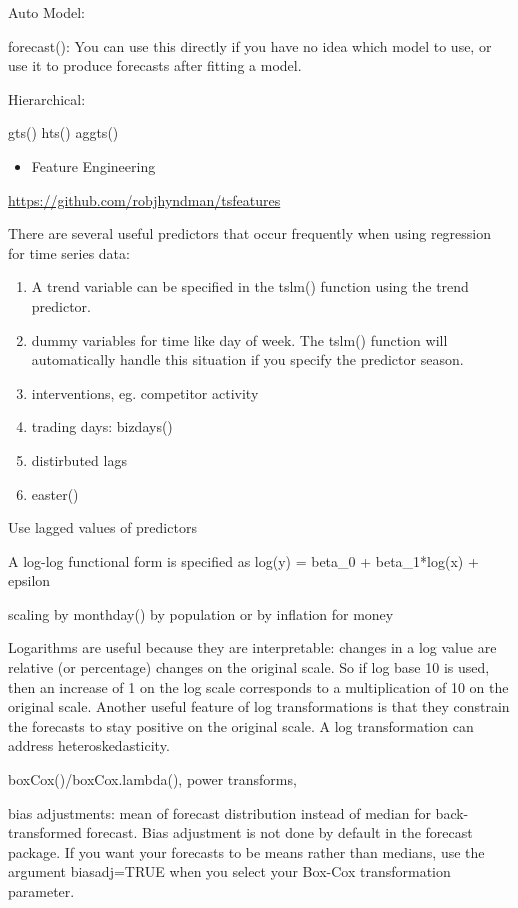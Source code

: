 \documentclass[]{book}
\providecommand{\tightlist}{%
  \setlength{\itemsep}{0pt}\setlength{\parskip}{0pt}}
\begin{document}
Auto Model:

forecast(): You can use this directly if you have no idea which model to
use, or use it to produce forecasts after fitting a model.

Hierarchical:

gts() \textbar{} hts() \textbar{} aggts()

\begin{itemize}
\tightlist
\item
  Feature Engineering
\end{itemize}

\url{https://github.com/robjhyndman/tsfeatures}

There are several useful predictors that occur frequently when using
regression for time series data:

\begin{enumerate}
\def\labelenumi{\arabic{enumi})}
\item
  A trend variable can be specified in the tslm() function using the
  trend predictor.
\item
  dummy variables for time like day of week. The tslm() function will
  automatically handle this situation if you specify the predictor
  season.
\item
  interventions, eg. competitor activity
\item
  trading days: bizdays()
\item
  distirbuted lags
\item
  easter()
\end{enumerate}

Use lagged values of predictors

A log-log functional form is specified as log(y) = beta\_0 +
beta\_1*log(x) + epsilon

scaling by monthday() by population or by inflation for money

Logarithms are useful because they are interpretable: changes in a log
value are relative (or percentage) changes on the original scale. So if
log base 10 is used, then an increase of 1 on the log scale corresponds
to a multiplication of 10 on the original scale. Another useful feature
of log transformations is that they constrain the forecasts to stay
positive on the original scale. A log transformation can address
heteroskedasticity.

boxCox()/boxCox.lambda(), power transforms,

bias adjustments: mean of forecast distribution instead of median for
back-transformed forecast. Bias adjustment is not done by default in the
forecast package. If you want your forecasts to be means rather than
medians, use the argument biasadj=TRUE when you select your Box-Cox
transformation parameter.
\end{document}
